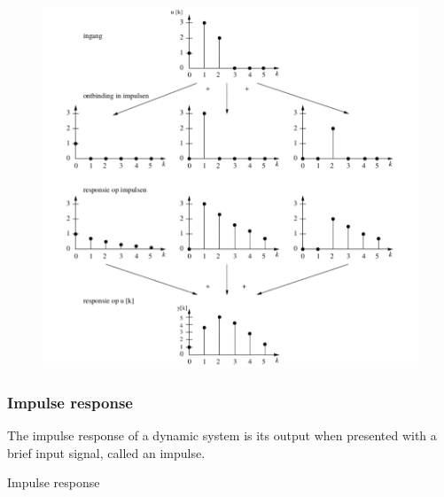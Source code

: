 \begin{frame}
	\begin{figure}
\centering
\includegraphics[height=0.8\textheight]{Images/discrete_time_systems_20}
\label{fig:discrete_time_systems_20}
\end{figure}

\end{frame}
\begin{frame}
	\frametitle{Impulse response}
	\begin{definition}
		The impulse response of a dynamic system is its output when presented with a brief input signal, called an impulse.
	\end{definition}
	\begin{block}{Impulse response}
	\end{block}
\end{frame}
